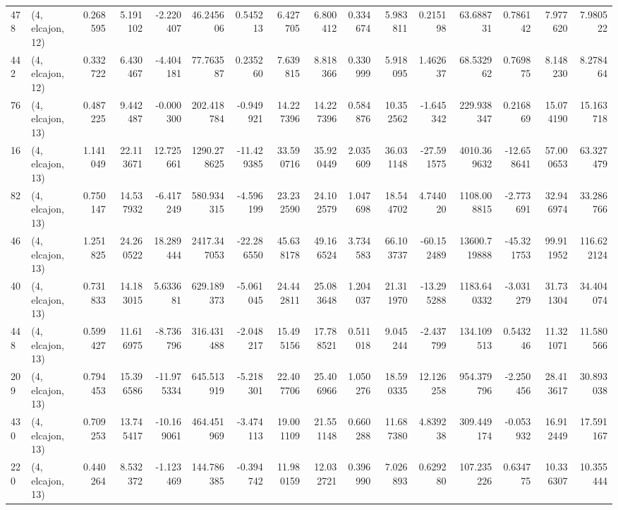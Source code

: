 \begin{tabular}{llrrrrrrrrrrrrrr}
478 &  (4, elcajon, 12) &   0.268595 &   5.191102 &  -2.220407 &    46.245606 &   0.545213 &   6.427705 &   6.800412 &  0.334674 &   5.983811 &   0.215198 &     63.688731 &   0.786142 &   7.977620 &    7.980522 \\
442 &  (4, elcajon, 12) &   0.332722 &   6.430467 &  -4.404181 &    77.763587 &   0.235260 &   7.639815 &   8.818366 &  0.330999 &   5.918095 &   1.462637 &     68.532962 &   0.769875 &   8.148230 &    8.278464 \\
76  &  (4, elcajon, 13) &   0.487225 &   9.442487 &  -0.000300 &   202.418784 &  -0.949921 &  14.227396 &  14.227396 &  0.584876 &  10.352562 &  -1.645342 &    229.938347 &   0.216869 &  15.074190 &   15.163718 \\
16  &  (4, elcajon, 13) &   1.141049 &  22.113671 &  12.725661 &  1290.278625 & -11.429385 &  33.590716 &  35.920449 &  2.035609 &  36.031148 & -27.591575 &   4010.369632 & -12.658641 &  57.000653 &   63.327479 \\
82  &  (4, elcajon, 13) &   0.750147 &  14.537932 &  -6.417249 &   580.934315 &  -4.596199 &  23.232590 &  24.102579 &  1.047698 &  18.544702 &   4.744020 &   1108.008815 &  -2.773691 &  32.946974 &   33.286766 \\
46  &  (4, elcajon, 13) &   1.251825 &  24.260522 &  18.289444 &  2417.347053 & -22.286550 &  45.638178 &  49.166524 &  3.734583 &  66.103737 & -60.152489 &  13600.719888 & -45.321753 &  99.911952 &  116.622124 \\
40  &  (4, elcajon, 13) &   0.731833 &  14.183015 &   5.633681 &   629.189373 &  -5.061045 &  24.442811 &  25.083648 &  1.204037 &  21.311970 & -13.295288 &   1183.640332 &  -3.031279 &  31.731304 &   34.404074 \\
448 &  (4, elcajon, 13) &   0.599427 &  11.616975 &  -8.736796 &   316.431488 &  -2.048217 &  15.495156 &  17.788521 &  0.511018 &   9.045244 &  -2.437799 &    134.109513 &   0.543246 &  11.321071 &   11.580566 \\
209 &  (4, elcajon, 13) &   0.794453 &  15.396586 & -11.975334 &   645.513919 &  -5.218301 &  22.407706 &  25.406966 &  1.050276 &  18.590335 &  12.126258 &    954.379796 &  -2.250456 &  28.413617 &   30.893038 \\
430 &  (4, elcajon, 13) &   0.709253 &  13.745417 & -10.169061 &   464.451969 &  -3.474113 &  19.001109 &  21.551148 &  0.660288 &  11.687380 &   4.839238 &    309.449174 &  -0.053932 &  16.912449 &   17.591167 \\
220 &  (4, elcajon, 13) &   0.440264 &   8.532372 &  -1.123469 &   144.786385 &  -0.394742 &  11.980159 &  12.032721 &  0.396990 &   7.026893 &   0.629280 &    107.235226 &   0.634775 &  10.336307 &   10.355444 \\

\end{tabular}
